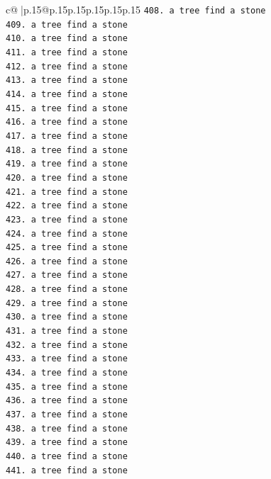 \documentclass{article}
\begin{document}
{\begin{supertabular}{c@{$\;$}|p{.15\linewidth}@{}p{.15\linewidth}p{.15\linewidth}p{.15\linewidth}p{.15\linewidth}p{.15\linewidth}}
{{{\texttt{408. a tree find a stone} \\
\texttt{409. a tree find a stone} \\
\texttt{410. a tree find a stone} \\
\texttt{411. a tree find a stone} \\
\texttt{412. a tree find a stone} \\
\texttt{413. a tree find a stone} \\
\texttt{414. a tree find a stone} \\
\texttt{415. a tree find a stone} \\
\texttt{416. a tree find a stone} \\
\texttt{417. a tree find a stone} \\
\texttt{418. a tree find a stone} \\
\texttt{419. a tree find a stone} \\
\texttt{420. a tree find a stone} \\
\texttt{421. a tree find a stone} \\
\texttt{422. a tree find a stone} \\
\texttt{423. a tree find a stone} \\
\texttt{424. a tree find a stone} \\
\texttt{425. a tree find a stone} \\
\texttt{426. a tree find a stone} \\
\texttt{427. a tree find a stone} \\
\texttt{428. a tree find a stone} \\
\texttt{429. a tree find a stone} \\
\texttt{430. a tree find a stone} \\
\texttt{431. a tree find a stone} \\
\texttt{432. a tree find a stone} \\
\texttt{433. a tree find a stone} \\
\texttt{434. a tree find a stone} \\
\texttt{435. a tree find a stone} \\
\texttt{436. a tree find a stone} \\
\texttt{437. a tree find a stone} \\
\texttt{438. a tree find a stone} \\
\texttt{439. a tree find a stone} \\
\texttt{440. a tree find a stone} \\
\texttt{441. a tree find a stone} \\
}}}
\end{supertabular}}
\end{document}

